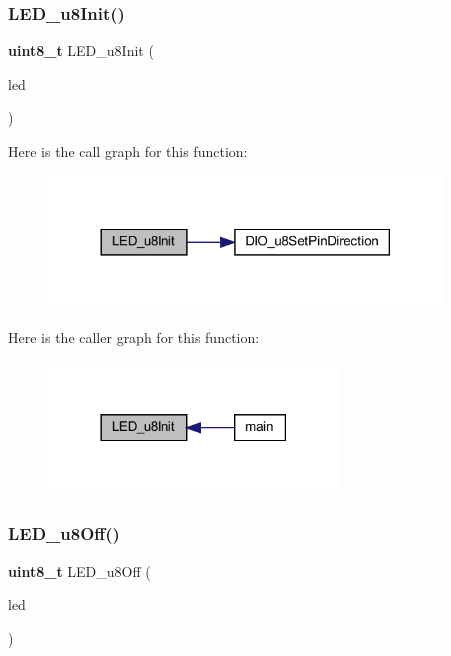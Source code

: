 \subsubsection{L\+E\+D\+\_\+u8\+Init()}
{\footnotesize\ttfamily \textbf{ uint8\+\_\+t} L\+E\+D\+\_\+u8\+Init (\begin{DoxyParamCaption}\item[{\textbf{ L\+E\+D\+\_\+t}}]{led }\end{DoxyParamCaption})}

Here is the call graph for this function\+:
\nopagebreak
\begin{figure}[H]
\begin{center}
\leavevmode
\includegraphics[width=296pt]{_l_e_d_8c_a5ffbd3f57e696c662ae3ae52b119e867_cgraph}
\end{center}
\end{figure}
Here is the caller graph for this function\+:
\nopagebreak
\begin{figure}[H]
\begin{center}
\leavevmode
\includegraphics[width=218pt]{_l_e_d_8c_a5ffbd3f57e696c662ae3ae52b119e867_icgraph}
\end{center}
\end{figure}
\mbox{\label{_l_e_d_8c_a9d5b876815db0f9fa1d1e2b3ecb4de64}} 
\subsubsection{L\+E\+D\+\_\+u8\+Off()}
{\footnotesize\ttfamily \textbf{ uint8\+\_\+t} L\+E\+D\+\_\+u8\+Off (\begin{DoxyParamCaption}\item[{\textbf{ L\+E\+D\+\_\+t}}]{led }\end{DoxyParamCaption})}

